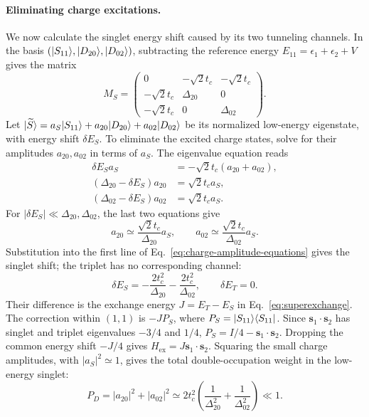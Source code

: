\paragraph{Eliminating charge excitations.}
We now calculate the singlet energy shift caused by its two
tunneling channels. In the basis
$(\lvert S_{11}\rangle,\lvert D_{20}\rangle,\lvert D_{02}\rangle)$, subtracting
the reference energy $E_{11}=\epsilon_1+\epsilon_2+V$ gives the matrix
\begin{equation}
  M_S=\begin{pmatrix}
       0&-\sqrt{2}t_c&-\sqrt{2}t_c\\
       -\sqrt{2}t_c&\Delta_{20}&0\\
       -\sqrt{2}t_c&0&\Delta_{02}
      \end{pmatrix}.
  \label{eq:singlet-charge-matrix}
\end{equation}
Let
$\lvert \widetilde S\rangle=a_S\lvert S_{11}\rangle+a_{20}\lvert D_{20}\rangle
+a_{02}\lvert D_{02}\rangle$ be its normalized low-energy eigenstate,
with energy shift $\delta E_S$.
To eliminate the excited charge states, solve for their amplitudes
$a_{20},a_{02}$ in terms of $a_S$. The eigenvalue equation reads
\begin{equation}
  \begin{aligned}
    \delta E_S a_S&=-\sqrt{2}t_c(a_{20}+a_{02}),\\
    (\Delta_{20}-\delta E_S)a_{20}&=\sqrt{2}t_c a_S,\\
    (\Delta_{02}-\delta E_S)a_{02}&=\sqrt{2}t_c a_S.
  \end{aligned}
  \label{eq:charge-amplitude-equations}
\end{equation}
For $|\delta E_S|\ll\Delta_{20},\Delta_{02}$, the last two equations give
\begin{equation}
  a_{20}\simeq\frac{\sqrt{2}t_c}{\Delta_{20}}a_S,\qquad
  a_{02}\simeq\frac{\sqrt{2}t_c}{\Delta_{02}}a_S.
  \label{eq:virtual-charge-amplitudes}
\end{equation}
Substitution into the first line of
Eq.~\eqref{eq:charge-amplitude-equations} gives the singlet shift;
the triplet has no corresponding channel:
\begin{equation}
  \delta E_S=-\frac{2t_c^2}{\Delta_{20}}
              -\frac{2t_c^2}{\Delta_{02}},\qquad
  \delta E_T=0.
  \label{eq:singlet-triplet-virtual-shifts}
\end{equation}
Their difference is the exchange energy $J=E_T-E_S$ in
Eq.~\eqref{eq:superexchange}. The correction within $(1,1)$ is
$-JP_S$, where $P_S=\lvert S_{11}\rangle\langle S_{11}\rvert$.
Since $\mathbf s_1\cdot\mathbf s_2$ has singlet and triplet
eigenvalues $-3/4$ and $1/4$,
$P_S=I/4-\mathbf s_1\cdot\mathbf s_2$.
Dropping the common energy shift $-J/4$ gives
$H_{\mathrm{ex}}=J\mathbf s_1\cdot\mathbf s_2$.
Squaring the small charge amplitudes, with $|a_S|^2\simeq1$,
gives the total double-occupation weight in the low-energy singlet:
\begin{equation}
  P_D=|a_{20}|^2+|a_{02}|^2
       \simeq 2t_c^2\left(\frac{1}{\Delta_{20}^2}
                          +\frac{1}{\Delta_{02}^2}\right)\ll1.
  \label{eq:double-occupation-weight}
\end{equation}

